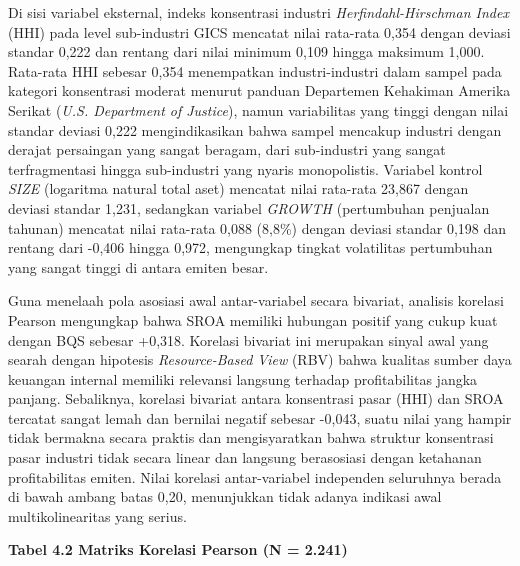 \documentclass[12pt,a4paper]{article}
\begin{document}
Di sisi variabel eksternal, indeks konsentrasi industri
\emph{Herfindahl-Hirschman Index} (HHI) pada level sub-industri GICS
mencatat nilai rata-rata 0,354 dengan deviasi standar 0,222 dan rentang
dari nilai minimum 0,109 hingga maksimum 1,000. Rata-rata HHI sebesar
0,354 menempatkan industri-industri dalam sampel pada kategori
konsentrasi moderat menurut panduan Departemen Kehakiman Amerika Serikat
(\emph{U.S. Department of Justice}), namun variabilitas yang tinggi
dengan nilai standar deviasi 0,222 mengindikasikan bahwa sampel mencakup
industri dengan derajat persaingan yang sangat beragam, dari
sub-industri yang sangat terfragmentasi hingga sub-industri yang nyaris
monopolistis. Variabel kontrol \emph{SIZE} (logaritma natural total
aset) mencatat nilai rata-rata 23,867 dengan deviasi standar 1,231,
sedangkan variabel \emph{GROWTH} (pertumbuhan penjualan tahunan)
mencatat nilai rata-rata 0,088 (8,8\%) dengan deviasi standar 0,198 dan
rentang dari -0,406 hingga 0,972, mengungkap tingkat volatilitas
pertumbuhan yang sangat tinggi di antara emiten besar.

Guna menelaah pola asosiasi awal antar-variabel secara bivariat,
analisis korelasi Pearson mengungkap bahwa SROA memiliki hubungan
positif yang cukup kuat dengan BQS sebesar +0,318. Korelasi bivariat ini
merupakan sinyal awal yang searah dengan hipotesis \emph{Resource-Based
View} (RBV) bahwa kualitas sumber daya keuangan internal memiliki
relevansi langsung terhadap profitabilitas jangka panjang. Sebaliknya,
korelasi bivariat antara konsentrasi pasar (HHI) dan SROA tercatat
sangat lemah dan bernilai negatif sebesar -0,043, suatu nilai yang
hampir tidak bermakna secara praktis dan mengisyaratkan bahwa struktur
konsentrasi pasar industri tidak secara linear dan langsung berasosiasi
dengan ketahanan profitabilitas emiten. Nilai korelasi antar-variabel
independen seluruhnya berada di bawah ambang batas 0,20, menunjukkan
tidak adanya indikasi awal multikolinearitas yang serius.

{}
\noindent\textbf{Tabel 4.2 Matriks Korelasi Pearson (N = 2.241)}
\end{document}
